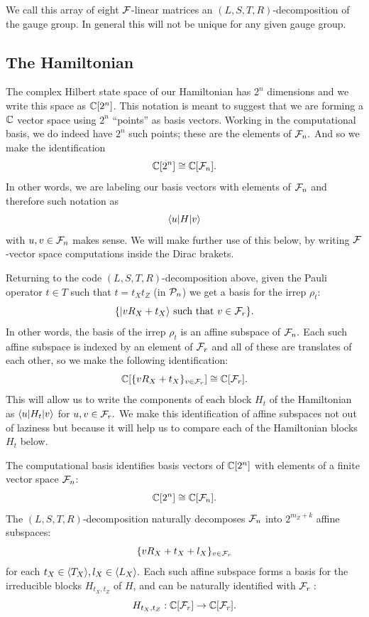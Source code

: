 We call this array of eight $\mathcal{F}$-linear 
matrices
an $(L,S,T,R)$-decomposition of the gauge group.
In general this will not be unique for
any given gauge group.

\subsection{The Hamiltonian}

The complex Hilbert state space of our
Hamiltonian has $2^n$ dimensions and we
write this space as $\mathbb{C}[2^n]$.
This notation is meant to suggest that
we are forming a $\mathbb{C}$ vector space
using $2^n$ ``points'' 
as basis vectors.
Working in the computational basis,
we do indeed have $2^n$ such points; 
these are the elements of $\mathcal{F}_{n}.$
And so we make the identification
$$
    \mathbb{C}[2^n] \cong \mathbb{C}[\mathcal{F}_{n}].
$$
In other words, we are labeling 
our basis vectors with elements of $\mathcal{F}_{n}$
and therefore such notation as
$$
    \langle{u}| H |{v}\rangle
$$
with $u, v \in \mathcal{F}_{n}$ makes sense.
We will make further use of this below,
by writing  $\mathcal{F}$-vector space 
computations inside the Dirac brakets.

Returning to the code $(L,S,T,R)$-decomposition
above,
given the Pauli operator $t\in T$ such that $t = t_X t_Z$ (in $\mathcal{P}_n$)
we get a basis for the irrep $\rho_t$:
$$
    \{ |{v R_X + t_X}\rangle \ \mbox{such that}\  v \in \mathcal{F}_{r} \}.
$$
In other words,
the basis of the irrep $\rho_t$ is 
an affine subspace of $\mathcal{F}_{n}.$
Each such affine subspace is indexed by an
element of $\mathcal{F}_{r}$ and
all of these are
translates of each other,
so we make the following identification:
$$
\mathbb{C}[\{vR_X+t_X\}_{v\in\mathcal{F}_{r}}]
\cong \mathbb{C}[\mathcal{F}_{r}].
$$
This will allow us to write the components
of each block $H_t$ of the Hamiltonian
as $\langle{u}|H_t|{v}\rangle$ for $u,v\in\mathcal{F}_{r}.$
We make this identification of affine subspaces
not out of laziness but because it will
help us to compare each of
the Hamiltonian blocks $H_t$ below.

\begin{framed}
The computational basis identifies
basis vectors of $\mathbb{C}[2^n]$
with elements of a finite vector space $\mathcal{F}_{n}$:
$$
    \mathbb{C}[2^n] \cong \mathbb{C}[\mathcal{F}_{n}].
$$
The $(L,S,T,R)$-decomposition naturally
decomposes $\mathcal{F}_{n}$ into $2^{m_Z+k}$ affine subspaces:
$$
    \{ v R_X + t_X + l_X \}_{v\in\mathcal{F}_{r}}
$$
for each $t_X \in \langle T_X \rangle, l_X \in \langle L_X \rangle.$
Each such affine subspace forms a basis
for the irreducible blocks $H_{t_X,t_Z}$ of $H$,
and can be naturally identified with $\mathcal{F}_{r}:$
$$
    H_{t_X,t_Z} : \mathbb{C}[\mathcal{F}_{r}] \to \mathbb{C}[\mathcal{F}_{r}].
$$
\end{framed}

